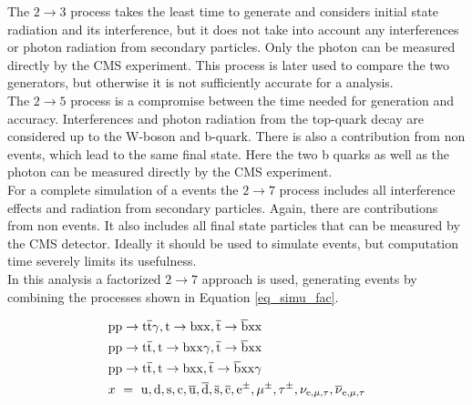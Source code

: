 The $2 \to 3$ process takes the least time to generate and considers initial state radiation and its interference, but it does not take into account any interferences or photon radiation from secondary particles. Only the photon can be measured directly by the CMS experiment.
This process is later used to compare the two generators, but otherwise it is not sufficiently accurate for a \ttgamma analysis.\\
The $2 \to 5$ process is a compromise between the time needed for generation and accuracy. Interferences and photon radiation from the top-quark decay are considered up to the W-boson and b-quark. There is also a contribution from non \ttgamma events, which lead to the same final state. Here the two b quarks as well as the photon can be measured directly by the CMS experiment. \\
For a complete simulation of a \ttgamma events the $2 \to 7$ process includes all interference effects and radiation from secondary particles. Again, there are contributions from non \ttgamma events. It also includes all final state particles that can be measured by the CMS detector. Ideally it should be used to simulate \ttgamma events, but computation time severely limits its usefulness. \\
In this analysis a factorized $2 \to 7$ approach is used, generating events by combining the processes shown in Equation \ref{eq_simu_fac}. 

\begin{equation}
\begin{split}
& \mathrm{pp}\to \mathrm{t}\overline{\mathrm{t}} \gamma,  \mathrm{t} \to \mathrm{bxx},  \overline{\mathrm{t}} \to \overline{\mathrm{b}} \mathrm{xx} \\
& \mathrm{pp}\to \mathrm{t} \overline{\mathrm{t}},  \mathrm{t} \to \mathrm{bxx} \gamma,  \overline{\mathrm{t}} \to \overline{\mathrm{b}} \mathrm{xx} \\
& \mathrm{pp}\to \mathrm{t} \overline{\mathrm{t}},  \mathrm{t} \to \mathrm{bxx},  \overline{\mathrm{t}} \to \overline{\mathrm{b}} \mathrm{xx} \gamma \\
&  x\ = \ \mathrm{u}, \mathrm{d}, \mathrm{s}, \mathrm{c}, \overline{\mathrm{u}}, \overline{\mathrm{d}},  \overline{\mathrm{s}},  \overline{\mathrm{c}}, \mathrm{e}^{\pm}, \mu^{\pm}, \tau^{\pm}, \nu_{\mathrm{e},\mu,\tau}, \overline{\nu}_{\mathrm{e},\mu,\tau} 
\end{split}
\label{eq_simu_fac}
\end{equation}

